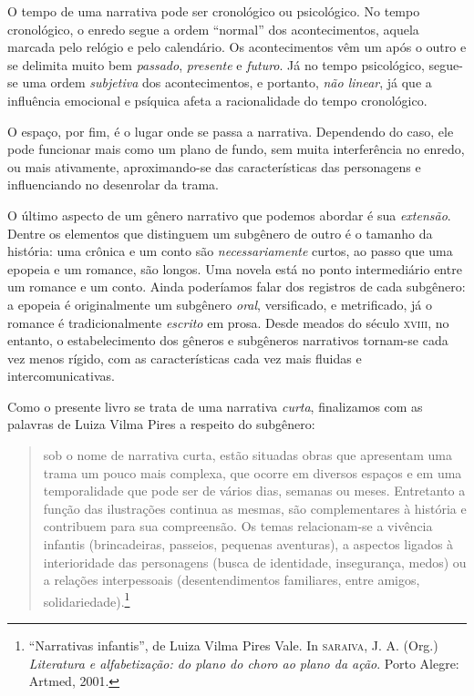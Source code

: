 \documentclass[11pt]{extarticle}
\begin{document}
O tempo de uma narrativa pode ser cronológico ou psicológico. No tempo cronológico, o enredo segue a ordem ``normal'' dos acontecimentos, aquela marcada pelo relógio e pelo calendário. Os acontecimentos vêm um após o outro e se delimita muito bem \textit{passado}, \textit{presente} e \textit{futuro}. Já no tempo psicológico, segue-se uma ordem \textit{subjetiva} dos acontecimentos, e portanto, \textit{não linear}, já que a influência emocional e psíquica afeta a racionalidade do tempo cronológico. 

O espaço, por fim, é o lugar onde se passa a narrativa. Dependendo do caso, ele pode funcionar mais como um plano de fundo, sem muita interferência no enredo, ou mais ativamente, aproximando-se das características das personagens e influenciando no desenrolar da trama. 


O último aspecto de um gênero narrativo que podemos abordar é sua \textit{extensão}. Dentre os elementos que distinguem um subgênero de outro é o tamanho da história: uma crônica e um conto são \textit{necessariamente} curtos, ao passo que uma epopeia e um romance, são longos. Uma novela está no ponto intermediário entre um romance e um conto. Ainda poderíamos falar dos registros de cada subgênero: a epopeia é originalmente um subgênero \textit{oral}, versificado, e metrificado, já o romance é tradicionalmente \textit{escrito} em prosa.  Desde meados do século \textsc{xviii}, no entanto, o estabelecimento dos gêneros e subgêneros narrativos tornam-se cada vez menos rígido, com as características cada vez mais fluidas e intercomunicativas.

Como o presente livro se trata de uma narrativa \textit{curta}, finalizamos com as palavras de Luiza Vilma Pires a respeito do
subgênero:

\begin{quote}
sob o nome de narrativa curta, estão situadas obras que apresentam uma trama um pouco mais complexa, que ocorre em diversos espaços e em uma temporalidade que pode ser de vários dias, semanas ou meses. Entretanto a função das ilustrações continua as mesmas, são complementares à história e contribuem para sua compreensão. Os temas relacionam-se a vivência infantis (brincadeiras, passeios, pequenas aventuras), a aspectos ligados à interioridade das personagens (busca de identidade, insegurança,  
medos) ou a relações interpessoais (desentendimentos familiares, entre amigos, solidariedade).\footnote{“Narrativas infantis”, de Luiza Vilma Pires Vale. In \textsc{saraiva}, J. A. (Org.) \textit{Literatura e alfabetização: do plano do choro ao plano da ação}. Porto Alegre: Artmed, 2001.} 
\end{quote}
\end{document}
